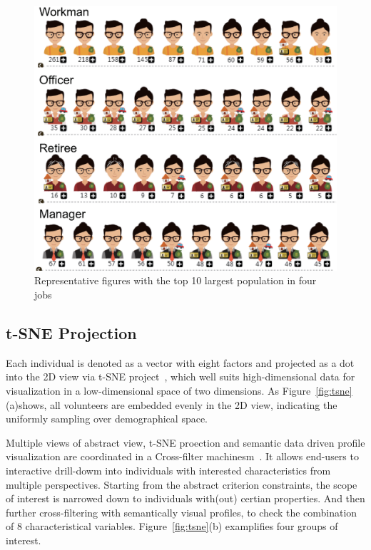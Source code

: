  
\begin{figure}[htb!]
 \centering %
 \includegraphics[width=\columnwidth]{pictures/design_example}
 \caption{Representative figures with the top 10 largest population in four jobs}
 \label{fig:div_example}
\end{figure}

\subsection{t-SNE Projection}

Each individual is denoted as a vector with eight factors and projected as a dot into the 2D view via t-SNE project~\cite{maaten2008visualizing}, which well suits high-dimensional data for visualization in a low-dimensional space of two dimensions. As Figure~\ref{fig:tsne}(a)shows, all volunteers are embedded evenly in the 2D view, indicating the uniformly sampling over demographical space. 

Multiple views of abstract view, t-SNE proection and semantic data driven profile visualization are coordinated in a Cross-filter machinesm~\cite{Weaver2010}. It allows end-users to interactive drill-dowm into individuals with interested characteristics from multiple perspectives. Starting from the abstract criterion constraints, the scope of interest is narrowed down to individuals with(out) certian properties. And then further cross-filtering with semantically visual profiles, to check the combination of 8 characteristical variables. Figure~\ref{fig:tsne}(b) examplifies four groups of interest. 

